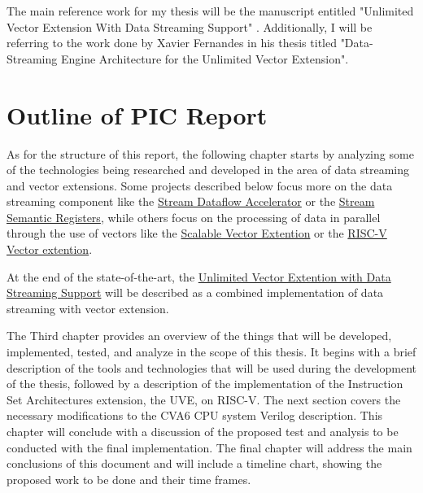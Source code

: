 The main reference work for my thesis will be the manuscript entitled "Unlimited Vector Extension With Data Streaming Support" \cite{uve-paper}. Additionally, I will be referring to the work done by Xavier Fernandes in his thesis titled "Data-Streaming Engine Architecture for the Unlimited Vector Extension".

\section{Outline of PIC Report}

As for the structure of this report, the following chapter starts by analyzing some of the technologies being researched and developed in the area of data streaming and vector extensions. Some projects described below focus more on the data streaming component like the \hyperref[label:stream_dataflow]{Stream Dataflow Accelerator} or the \hyperref[label:ssr]{Stream Semantic Registers}, while others focus on the processing of data in parallel through the use of vectors like the \hyperref[label:arm-sve]{Scalable Vector Extention} or the \hyperref[label:rvv]{RISC-V Vector extention}. 

At the end of the state-of-the-art, the \hyperref[label:uve]{Unlimited Vector Extention with Data Streaming Support} will be described as a combined implementation of data streaming with vector extension. 

The Third chapter provides an overview of the things that will be developed, implemented, tested, and analyze in the scope of this thesis. It begins with a brief description of the tools and technologies that will be used during the development of the thesis, followed by a description of the implementation of the Instruction Set Architectures extension, the \acrlong{UVE}, on RISC-V. The next section covers the necessary modifications to the CVA6 CPU system Verilog description. 
This chapter will conclude with a discussion of the proposed test and analysis to be conducted with the final implementation.
The final chapter will address the main conclusions of this document and will include a timeline chart, showing the proposed work to be done and their time frames.